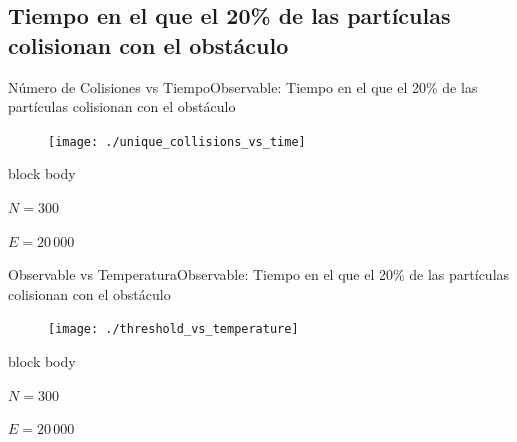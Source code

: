 \documentclass{beamer}
\begin{document}
        \subsection{Tiempo en el que el 20\% de las partículas colisionan con el obstáculo}

            \begin{frame}{Número de Colisiones vs Tiempo}{Observable: Tiempo en el que el 20\% de las partículas colisionan con el obstáculo}
                \begin{figure}[H!]
                    \texttt{[image: ./unique\_collisions\_vs\_time]}
                    \label{fig:threshold_1}
                \end{figure}
                \begin{beamercolorbox}[sep=5pt,center]{block body}
                    \begin{minipage}[t]{0.45\textwidth}
                        \centering
                        \small{$N=300$}
                    \end{minipage}
                    \hfill
                    \begin{minipage}[t]{0.45\textwidth}
                        \centering
                        \small{$E=20\,000$}
                    \end{minipage}
                \end{beamercolorbox}
            \end{frame}

            \begin{frame}{Observable vs Temperatura}{Observable: Tiempo en el que el 20\% de las partículas colisionan con el obstáculo}
                \begin{figure}[H!]
                    \texttt{[image: ./threshold\_vs\_temperature]}
                    \label{fig:threshold_2}
                \end{figure}
                \begin{beamercolorbox}[sep=5pt,center]{block body}
                    \begin{minipage}[t]{0.45\textwidth}
                        \centering
                        \small{$N=300$}
                    \end{minipage}
                    \hfill
                    \begin{minipage}[t]{0.45\textwidth}
                        \centering
                        \small{$E=20\,000$}
                    \end{minipage}
                \end{beamercolorbox}
            \end{frame}
\end{document}
